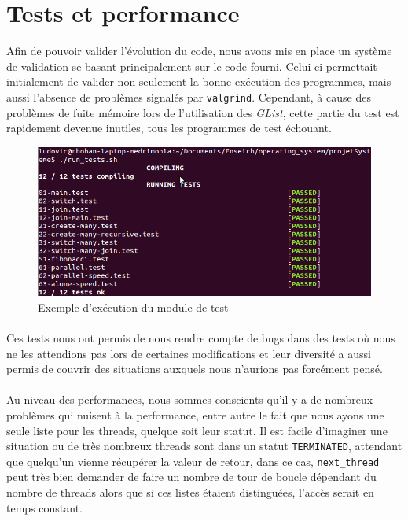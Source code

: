 \documentclass{article}
\begin{document}
	\section{Tests et performance}
    Afin de pouvoir valider l'évolution du code, nous avons mis en place un
    système de validation se basant principalement sur le code fourni.
    Celui-ci permettait initialement de valider non seulement la bonne
    exécution des programmes, mais aussi l'absence de problèmes signalés par
    \verb!valgrind!. Cependant, à cause des problèmes de fuite mémoire lors
    de l'utilisation des {\em GList}, cette partie du test est rapidement
    devenue inutiles, tous les programmes de test échouant.
    \begin{figure}[H]
      \caption{Exemple d'exécution du module de test}
      \centering
      \includegraphics [width=\textwidth]{tests.png}
    \end{figure}
    \paragraph{}
    Ces tests nous ont permis de nous rendre compte de bugs dans des tests
    où nous ne les attendions pas lors de certaines modifications et leur
    diversité a aussi permis de couvrir des situations auxquels nous
    n'aurions pas forcément pensé.
    \paragraph{}
    Au niveau des performances, nous sommes conscients qu'il y a de
    nombreux problèmes qui nuisent à la performance, entre autre le fait que
    nous ayons une seule liste pour les threads, quelque soit leur statut. Il
    est facile d'imaginer une situation ou de très nombreux threads sont dans
    un statut \verb!TERMINATED!, attendant que quelqu'un vienne récupérer
    la valeur de retour, dans ce cas, \verb!next_thread! peut très bien
    demander de faire un nombre de tour de boucle dépendant du nombre de
    threads alors que si ces listes étaient distinguées, l'accès serait en
    temps constant.
\end{document}
